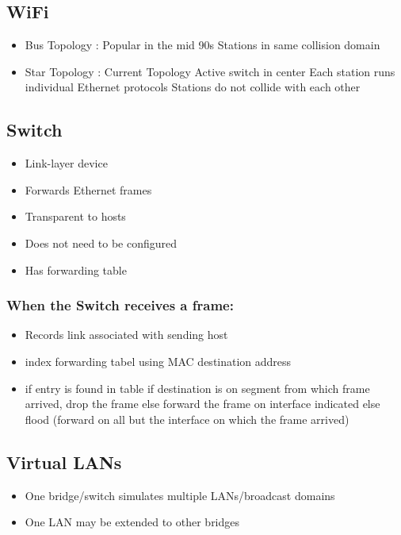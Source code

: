 \documentclass[../resumosRCOM.tex]{subfiles}
\begin{document}
\subsection{WiFi}
\begin{itemize}
    \item Bus Topology :
    \subitem Popular in the mid 90s
    \subitem Stations in same collision domain
    \item Star Topology :
    \subitem Current Topology
    \subitem Active switch in center
    \subitem Each station runs individual Ethernet protocols
    \subitem Stations do not collide with each other
\end{itemize}
\subsection{Switch}
\begin{itemize}
    \item Link-layer device
    \item Forwards Ethernet frames
    \item Transparent to hosts
    \item Does not need to be configured
    \item Has forwarding table
\end{itemize}
\subsubsection{When the Switch receives a frame:}
\begin{itemize}
    \item Records link associated with sending host
    \item index forwarding tabel using MAC destination address
    \item if entry is found in table
    \subitem if destination is on segment from which frame arrived,
    \subsubitem drop the frame
    \subitem else
    \subsubitem forward the frame on interface indicated
    else flood (forward on all but the interface on which the frame arrived)
\end{itemize}
\subsection{Virtual LANs}
\begin{itemize}
    \item One bridge/switch simulates multiple LANs/broadcast domains
    \item One LAN may be extended to other bridges
\end{itemize}
\end{document}
